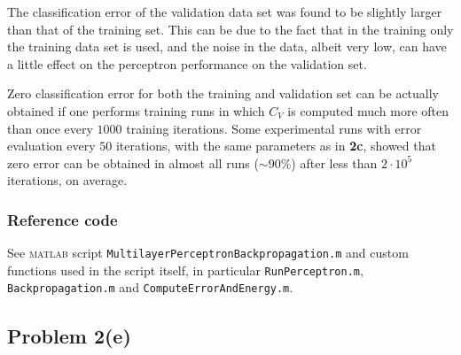 \documentclass[12pt,titlepage]{article}
\begin{document}
The classification error of the validation data set was found to be slightly larger than that of the training set. This can be due to the fact that in the training only the training data set is used, and the noise in the data, albeit very low, can have a little effect on the perceptron performance on the validation set. %

Zero classification error for both the training and validation set can be actually obtained if one performs training runs in which $C_V$ is computed much more often than once every $1000$ training iterations. Some experimental runs with error evaluation every $50$ iterations, with the same parameters as in \textbf{2c}, showed that zero error can be obtained in almost all runs ($\sim 90\%$) after less than $2\cdot 10^5$ iterations, on average.

\vfill

\subsubsection*{Reference code}
\vspace*{-0.2cm}
See \textsc{matlab} script \verb!MultilayerPerceptronBackpropagation.m! and custom functions used in the script itself, in particular \verb!RunPerceptron.m!, \verb!Backpropagation.m! and \verb!ComputeErrorAndEnergy.m!.

\clearpage


\subsection*{Problem 2(e)}
\end{document}
